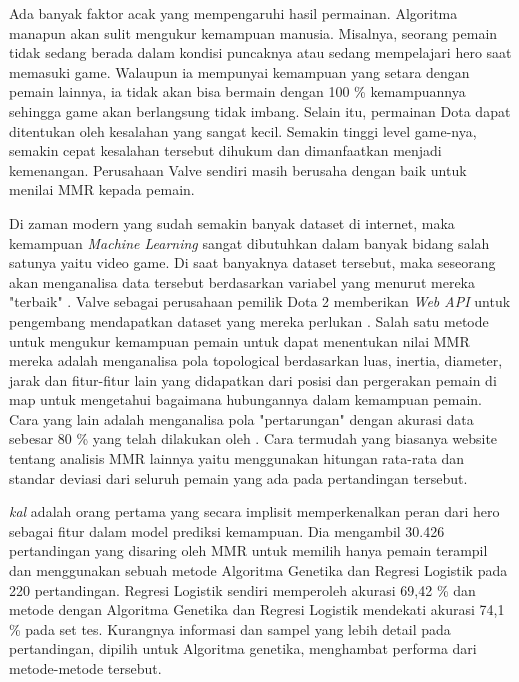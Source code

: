 \documentclass[skripsi]{ugmskripsi}
\begin{document}
Ada banyak faktor acak yang mempengaruhi hasil permainan. Algoritma manapun akan sulit mengukur kemampuan manusia. Misalnya, seorang pemain tidak sedang berada dalam kondisi puncaknya atau sedang mempelajari  hero saat memasuki game. Walaupun ia mempunyai kemampuan yang setara dengan pemain lainnya, ia tidak akan bisa bermain dengan 100 \% kemampuannya sehingga game akan berlangsung tidak imbang. Selain itu, permainan Dota dapat ditentukan oleh kesalahan yang sangat kecil. Semakin tinggi level game-nya, semakin cepat kesalahan tersebut dihukum dan dimanfaatkan menjadi kemenangan. Perusahaan Valve sendiri masih berusaha dengan baik untuk menilai MMR kepada pemain.

Di zaman modern yang sudah semakin banyak dataset di internet, maka kemampuan \emph{Machine Learning} sangat dibutuhkan dalam banyak bidang salah satunya yaitu video game. Di saat banyaknya dataset tersebut, maka seseorang akan menganalisa data tersebut berdasarkan variabel yang menurut mereka "terbaik" \citep{dgd}. Valve sebagai perusahaan pemilik Dota 2 memberikan \emph{Web API} untuk pengembang mendapatkan dataset yang mereka perlukan \citep{sng}. Salah satu metode untuk mengukur kemampuan pemain untuk dapat menentukan nilai MMR mereka adalah menganalisa pola topological berdasarkan luas, inertia, diameter, jarak dan fitur-fitur lain yang didapatkan dari posisi dan pergerakan pemain di map untuk mengetahui bagaimana hubungannya dalam kemampuan pemain. Cara yang lain adalah menganalisa pola "pertarungan" dengan akurasi data sebesar 80 \% yang telah dilakukan oleh \citep{drc}. Cara termudah yang biasanya website tentang analisis MMR lainnya yaitu menggunakan hitungan rata-rata dan standar deviasi dari seluruh pemain yang ada pada pertandingan tersebut.

\emph{kal} adalah orang pertama yang secara implisit memperkenalkan peran dari hero sebagai fitur dalam model prediksi kemampuan. Dia mengambil 30.426 pertandingan yang disaring oleh MMR untuk memilih hanya pemain terampil dan
menggunakan sebuah metode Algoritma Genetika dan Regresi Logistik pada 220 pertandingan. Regresi Logistik sendiri memperoleh akurasi 69,42 \% dan metode dengan Algoritma Genetika dan Regresi Logistik mendekati akurasi 74,1 \% pada
set tes. Kurangnya informasi  dan sampel yang lebih detail pada pertandingan, dipilih untuk Algoritma genetika, menghambat performa dari metode-metode tersebut.
\end{document}

